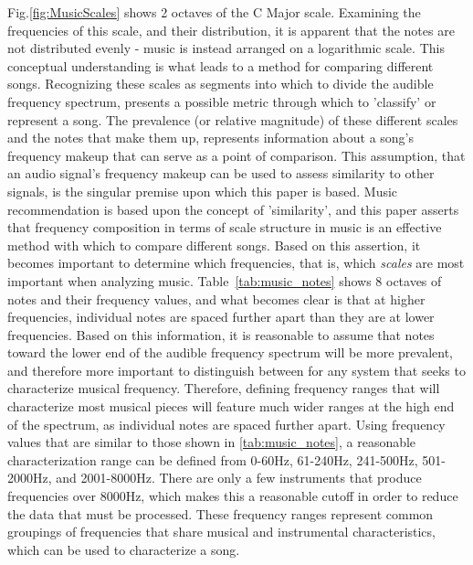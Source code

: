 \documentclass[conference]{IEEEtran}
\begin{document}
Fig.\eqref{fig:MusicScales} shows 2 octaves of the C Major scale. Examining the frequencies of this scale, and their distribution, it is apparent that the notes are not distributed evenly - music is instead arranged on a logarithmic scale. This conceptual understanding is what leads to a method for comparing different songs. Recognizing these scales as segments into which to divide the audible frequency spectrum, presents a possible metric through which to 'classify' or represent a song. The prevalence (or relative magnitude) of these different scales and the notes that make them up, represents information about a song's frequency makeup that can serve as a point of comparison. This assumption, that an audio signal's frequency makeup can be used to assess similarity to other signals, is the singular premise upon which this paper is based. Music recommendation is based upon the concept of 'similarity', and this paper asserts that frequency composition in terms of scale structure in music is an effective method with which to compare different songs. Based on this assertion, it becomes important to determine which frequencies, that is, which \textit{scales} are most important when analyzing music. Table~\eqref{tab:music_notes} shows 8 octaves of notes and their frequency values, and what becomes clear is that at higher frequencies, individual notes are spaced further apart than they are at lower frequencies. Based on this information, it is reasonable to assume that notes toward the lower end of the audible frequency spectrum will be more prevalent, and therefore more important to distinguish between for any system that seeks to characterize musical frequency. Therefore, defining frequency ranges that will characterize most musical pieces will feature much wider ranges at the high end of the spectrum, as individual notes are spaced further apart. Using frequency values that are similar to those shown in \eqref{tab:music_notes}, a reasonable characterization range can be defined from 0-60Hz, 61-240Hz, 241-500Hz, 501-2000Hz, and 2001-8000Hz. There are only a few instruments that produce frequencies over 8000Hz, which makes this a reasonable cutoff in order to reduce the data that must be processed. These frequency ranges represent common groupings of frequencies that share musical and instrumental characteristics, which can be used to characterize a song. 
\end{document}

